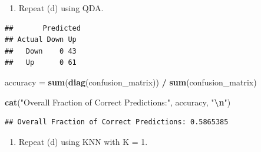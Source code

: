\documentclass[
]{article}
\newenvironment{Shaded}{\begin{snugshade}}{\end{snugshade}}
\newcommand{\AttributeTok}[1]{\textcolor[rgb]{0.13,0.29,0.53}{#1}}
\newcommand{\FunctionTok}[1]{\textcolor[rgb]{0.13,0.29,0.53}{\textbf{#1}}}
\newcommand{\NormalTok}[1]{#1}
\newcommand{\OtherTok}[1]{\textcolor[rgb]{0.56,0.35,0.01}{#1}}
\newcommand{\SpecialCharTok}[1]{\textcolor[rgb]{0.81,0.36,0.00}{\textbf{#1}}}
\newcommand{\StringTok}[1]{\textcolor[rgb]{0.31,0.60,0.02}{#1}}
\providecommand{\tightlist}{%
  \setlength{\itemsep}{0pt}\setlength{\parskip}{0pt}}
\begin{document}
\begin{enumerate}
\def\labelenumi{(\alph{enumi})}
\setcounter{enumi}{5}
\tightlist
\item
  Repeat (d) using QDA.
\end{enumerate}

\begin{Shaded}
\end{Shaded}

\begin{verbatim}
##       Predicted
## Actual Down Up
##   Down    0 43
##   Up      0 61
\end{verbatim}

\begin{Shaded}
\begin{Highlighting}[]
\NormalTok{accuracy }\OtherTok{=} \FunctionTok{sum}\NormalTok{(}\FunctionTok{diag}\NormalTok{(confusion\_matrix)) }\SpecialCharTok{/} \FunctionTok{sum}\NormalTok{(confusion\_matrix)}

\FunctionTok{cat}\NormalTok{(}\StringTok{"Overall Fraction of Correct Predictions:"}\NormalTok{, accuracy, }\StringTok{"}\SpecialCharTok{\textbackslash{}n}\StringTok{"}\NormalTok{)}
\end{Highlighting}
\end{Shaded}

\begin{verbatim}
## Overall Fraction of Correct Predictions: 0.5865385
\end{verbatim}

\begin{enumerate}
\def\labelenumi{(\alph{enumi})}
\setcounter{enumi}{6}
\tightlist
\item
  Repeat (d) using KNN with K = 1.
\end{enumerate}
\end{document}
